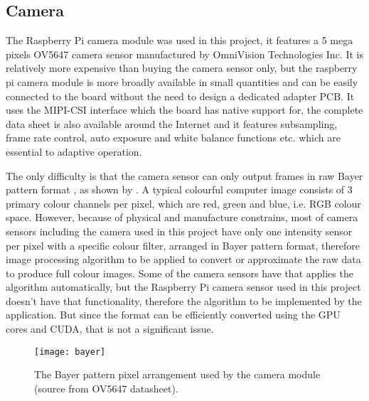 \subsection{Camera}


The Raspberry Pi camera module was used in this project, it features a 5 mega pixels OV5647 camera sensor manufactured by OmniVision Technologies Inc. It is relatively more expensive than buying the camera sensor only, but the raspberry pi camera module is more broadly available in small quantities and can be easily connected to the board without the need to design a dedicated adapter PCB. It uses the MIPI-CSI interface which the board has native support for, the complete data sheet is also available around the Internet and it features subsampling, frame rate control, auto exposure and white balance functions etc. which are essential to adaptive operation.

The only difficulty is that the camera sensor can only output frames in raw Bayer pattern format \cite{bayer1976color}, as shown by . A typical colourful computer image consists of 3 primary colour channels per pixel, which are red, green and blue, i.e. RGB colour space. However, because of physical and manufacture constrains, most of camera sensors including the camera used in this project have only one intensity sensor per pixel with a specific colour filter, arranged in Bayer pattern format, therefore image processing algorithm  to be applied to convert or approximate the raw data to produce full colour images. Some of the camera sensors have  that applies the algorithm automatically, but the Raspberry Pi camera sensor used in this project doesn't have that functionality, therefore the algorithm  to be implemented by the application. But since the format can be efficiently converted using the GPU cores and CUDA, that is not a significant issue.

\begin{figure}[H]
  \centering
  \texttt{[image: bayer]}
  \caption{The Bayer pattern pixel arrangement used by the camera module (source from OV5647 datasheet).}
  \label{bayer}
\end{figure}

